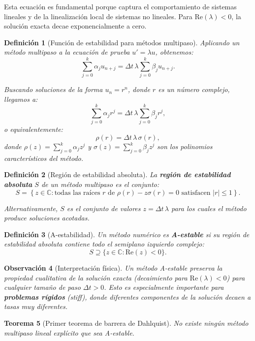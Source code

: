 \documentclass[a4paper,11pt]{report}
\newtheorem{theorem}{Teorema}[chapter]
\newtheorem{definition}[theorem]{Definición}
\newtheorem{remark}[theorem]{Observación}
\begin{document}
Esta ecuación es fundamental porque captura el comportamiento de sistemas lineales y de la linealización local de sistemas no lineales. Para $\text{Re}(\lambda) < 0$, la solución exacta decae exponencialmente a cero.

\begin{definition}[Función de estabilidad para métodos multipaso]
Aplicando un método multipaso a la ecuación de prueba $u' = \lambda u$, obtenemos:
\[
\sum_{j=0}^k \alpha_j u_{n+j} = \Delta t\,\lambda \sum_{j=0}^k \beta_j u_{n+j}.
\]

Buscando soluciones de la forma $u_n = r^n$, donde $r$ es un número complejo, llegamos a:
\[
\sum_{j=0}^k \alpha_j r^j = \Delta t\,\lambda \sum_{j=0}^k \beta_j r^j,
\]
o equivalentemente:
\[
\rho(r) = \Delta t\,\lambda \,\sigma(r),
\]
donde $\rho(z) = \sum_{j=0}^k \alpha_j z^j$ y $\sigma(z) = \sum_{j=0}^k \beta_j z^j$ son los polinomios característicos del método.
\end{definition}

\begin{definition}[Región de estabilidad absoluta]
La \textbf{región de estabilidad absoluta} $S$ de un método multipaso es el conjunto:
\[
S = \left\{ z \in \mathbb{C} : \text{todas las raíces } r \text{ de } \rho(r) - z\sigma(r) = 0 \text{ satisfacen } |r| \leq 1 \right\}.
\]

Alternativamente, $S$ es el conjunto de valores $z = \Delta t\,\lambda$ para los cuales el método produce soluciones acotadas.
\end{definition}

\begin{definition}[A-estabilidad]
Un método numérico es \textbf{A-estable} si su región de estabilidad absoluta contiene todo el semiplano izquierdo complejo:
\[
S \supseteq \{ z \in \mathbb{C} : \text{Re}(z) < 0 \}.
\]
\end{definition}

\begin{remark}[Interpretación física]
Un método A-estable preserva la propiedad cualitativa de la solución exacta (decaimiento para $\text{Re}(\lambda) < 0$) para cualquier tamaño de paso $\Delta t > 0$. Esto es especialmente importante para \textbf{problemas rígidos} (stiff), donde diferentes componentes de la solución decaen a tasas muy diferentes.
\end{remark}

\begin{theorem}[Primer teorema de barrera de Dahlquist]
No existe ningún método multipaso lineal explícito que sea A-estable.
\end{theorem}
\end{document}
